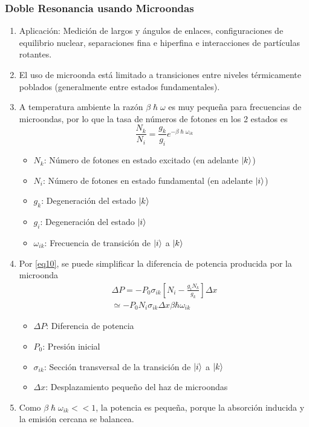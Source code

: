 \documentclass[aps,rmp,reprint,longbibliography]{revtex4-1}
\begin{document}
\subsubsection{Doble Resonancia usando Microondas}
\begin{enumerate}
\item Aplicación: Medición de largos y ángulos de enlaces, configuraciones de equilibrio nuclear, separaciones fina e hiperfina e interacciones de partículas rotantes.
\item El uso de microonda está limitado a transiciones entre niveles térmicamente poblados (generalmente entre estados fundamentales). 
\item A temperatura ambiente la razón $\beta\hslash\omega$ es muy pequeña para frecuencias de microondas, por lo que la tasa de números de fotones en los 2 estados es
\begin{equation}\label{eq10}\frac{N_k}{N_i}=\frac{g_k}{g_i}e^{-\beta\hslash\omega_{ik}}\end{equation}
\begin{itemize}
    \item $N_k$: Número de fotones en estado excitado (en adelante $\ket{k}$)
    \item $N_i$: Número de fotones en estado fundamental (en adelante $\ket{i}$)
    \item $g_k$: Degeneración del estado $\ket{k}$
    \item $g_i$: Degeneración del estado $\ket{i}$
    \item $\omega_{ik}$: Frecuencia de transición de $\ket{i}$ a $\ket{k}$
\end{itemize}
\item Por \ref{eq10}, se puede simplificar la diferencia de potencia producida por la microonda
\begin{equation}\label{eq11}\begin{aligned}\Delta P=-P_0\sigma_{ik}[N_i-\frac{g_iN_k}{g_k}]\Delta x \\ \simeq -P_0 N_i\sigma_{ik}\Delta x\beta\hbar\omega_{ik}\end{aligned}\end{equation}
\begin{itemize}
    \item $\Delta P$: Diferencia de potencia
    \item $P_0$: Presión inicial
    \item $\sigma_{ik}$: Sección transversal de la transición de $\ket{i}$ a $\ket{k}$
    \item $\Delta x$: Desplazamiento pequeño del haz de microondas
\end{itemize}
\item Como $\beta\hslash\omega_{ik} << 1$, la potencia es pequeña, porque la absorción inducida y la emisión cercana se balancea. 
\end{enumerate}
\end{document}
